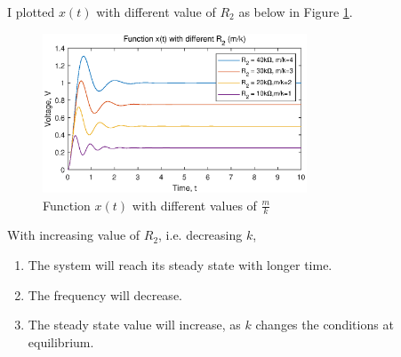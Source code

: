 I plotted $x(t)$ with different value of $R_2$ as below in Figure \ref{pic-m-k}.

\begin{figure}
  \centering
  \includegraphics[width=0.7\textwidth]{pics/change-m-k.eps}
  \caption{Function $x(t)$ with different values of $\frac{m}{k}$}
  \label{pic-m-k}
\end{figure}

With increasing value of $R_2$, i.e. decreasing $k$,
\begin{enumerate}
  \item The system will reach its steady state with longer time.
  \item The frequency will decrease.
  \item The steady state value will increase, as $k$ changes the conditions
  at equilibrium.
\end{enumerate}

\pagebreak
{}
